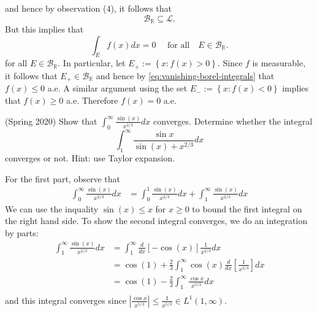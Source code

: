 \documentclass[answers]{exam}
\theoremstyle{problemstyle}
\newcommand{\1}[1]{\textbf{1}_{\left[#1\right]}} %
\begin{document}
\begin{questions}
\begin{solution}
and hence by observation (4), it follows that
\begin{equation*}
  \mathcal{B}_{\mathbb{R}}\subseteq  \mathcal{L}.
\end{equation*}
But this implies that
\begin{equation}\label{eq:vanishing-borel-integrals}
  \int_{E}f(x)dx = 0 \quad\text{ for all}\quad E\in \mathcal{B}_{\mathbb{R}}.
\end{equation}
for all $E\in \mathcal{B}_{\mathbb{R}}$. In particular, let $E_{+}:= \left\{x:
  f(x)>0\right\}$. Since $f$ is measurable, it follows that $E_{+}\in \mathcal{B}_{\mathbb{R}}$
and hence by \eqref{eq:vanishing-borel-integrals} that $f(x)\leq 0$ a.e. A
similar argument using the set $E_{-}:= \left\{x: f(x)<0\right\}$ implies that
$f(x)\geq 0$ a.e. Therefore $f(x)=0$ a.e.
\end{solution}





\question (Spring 2020) Show that $\int_{0}^{\infty}\frac{\sin(x)}{x^{2/3}}dx$
converges. Determine whether the integral
\begin{equation*}
  \int_{1}^{\infty}\frac{\sin x}{\sin(x) +x^{2/3}} dx 
\end{equation*}
converges or not. Hint: use Taylor expansion.

\begin{solution}
For the first part, observe that
\begin{align*}
  \int_{0}^{\infty}\frac{\sin(x)}{x^{2/3}}dx
  &=  \int_{0}^{1}\frac{\sin(x)}{x^{2/3}}dx +  \int_{1}^{\infty}\frac{\sin(x)}{x^{2/3}}dx 
\end{align*}
We can use the inquality $\sin(x) \leq x$ for $x \geq 0$ to bound the first
integral on the right hand side. To show the second integral converges, we do
an integration by parts:
\begin{align*}
  \int_{1}^{\infty}\frac{\sin(x)}{x^{2/3}}dx
  &= \int_{1}^{\infty}\frac{d}{dx}\left[ -\cos(x) \right] \frac{1}{x^{2/3}}dx\\ 
  &= \cos(1) + \frac{2}{3}\int_{1}^{\infty}\cos(x) \frac{d}{dx} \left[  \frac{1}{x^{2/3}} \right] dx\\ 
  &= \cos(1) - \frac{2}{3}\int_{1}^{\infty} \frac{\cos x}{x^{5/3}} dx\\ 
\end{align*}
and this integral converges since $\left| \frac{\cos x}{x^{5/3}}  \right| \leq
\frac{1}{x^{5/3}}\in L^{1}(1,\infty)$.  


\end{solution}
\end{questions}
\end{document}
